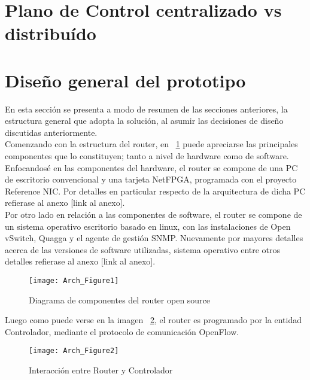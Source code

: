 \section[Alternativas de dise\~nio]{Plano de Control centralizado vs distribu\'ido}

\section[Dise\~no general del prototipo]{Dise\~no general del prototipo}

En esta secci\'on se presenta a modo de resumen de las secciones anteriores, la estructura general que adopta la soluci\'on, al asumir las decisiones de dise\~no discutidas anteriormente.\\

Comenzando con la estructura del router, en ~\ref{fig:OpenSourceRArch} puede apreciarse las principales componentes que lo constituyen; tanto a nivel de hardware como de software.\\
Enfocandos\'e en las componentes del hardware, el router se compone de una PC de escritorio convencional y una tarjeta NetFPGA, programada con el proyecto Reference NIC. Por detalles en particular respecto de la arquitectura de dicha PC refierase al anexo [link al anexo].\\  
Por otro lado en relaci\'on a las componentes de software, el router se compone de un sistema operativo escritorio basado en linux, con las instalaciones de Open vSwitch, Quagga y el agente de gesti\'on SNMP. Nuevamente por mayores detalles acerca de las versiones de software utilizadas, sistema operativo entre otros detalles refierase al anexo [link al anexo].\\

\newpage
\begin{figure}[htbp!] 
\centering    
\texttt{[image: Arch\_Figure1]}
\caption[OpenSourceRArch]{Diagrama de componentes del router open source}
\label{fig:OpenSourceRArch}
\end{figure}

Luego como puede verse en la imagen ~\ref{fig:OpenSourceRArch2}, el router es programado por la entidad Controlador, mediante el protocolo de comunicaci\'on OpenFlow.


\begin{figure}[htbp!] 
\centering    
\texttt{[image: Arch\_Figure2]}
\caption[OpenSourceRArch2]{Interacci\'on entre Router y Controlador}
\label{fig:OpenSourceRArch2}
\end{figure}

